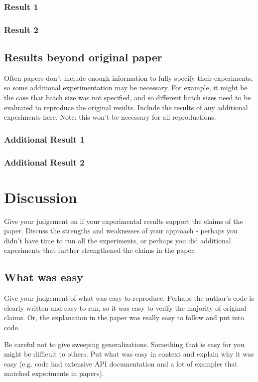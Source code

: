\subsubsection{Result 1}

\subsubsection{Result 2}

\subsection{Results beyond original paper}
Often papers don't include enough information to fully specify their experiments, so some additional experimentation may be necessary. For example, it might be the case that batch size was not specified, and so different batch sizes need to be evaluated to reproduce the original results. Include the results of any additional experiments here. Note: this won't be necessary for all reproductions.
 
\subsubsection{Additional Result 1}
\subsubsection{Additional Result 2}

\section{Discussion}

Give your judgement on if your experimental results support the claims of the paper. Discuss the strengths and weaknesses of your approach - perhaps you didn't have time to run all the experiments, or perhaps you did additional experiments that further strengthened the claims in the paper.

\subsection{What was easy}
Give your judgement of what was easy to reproduce. Perhaps the author's code is clearly written and easy to run, so it was easy to verify the majority of original claims. Or, the explanation in the paper was really easy to follow and put into code. 

Be careful not to give sweeping generalizations. Something that is easy for you might be difficult to others. Put what was easy in context and explain why it was easy (e.g. code had extensive API documentation and a lot of examples that matched experiments in papers). 


